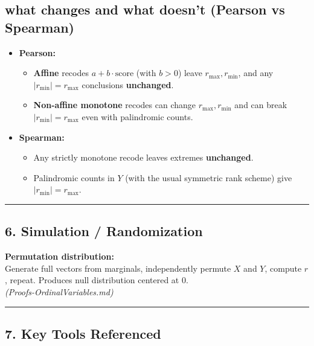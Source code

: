 \documentclass[
  letterpaper,
  DIV=11,
  numbers=noendperiod]{scrartcl}
\theoremstyle{remark}
\begin{document}
\subsection{what changes and what doesn't (Pearson vs
Spearman)}\label{what-changes-and-what-doesnt-pearson-vs-spearman}

\begin{itemize}
\item
  \textbf{Pearson:}

  \begin{itemize}
  \item
    \textbf{Affine} recodes \(a+b\cdot\text{score}\) (with \(b>0\))
    leave \(r_{\max}, r_{\min}\), and any \(|r_{\min}|=r_{\max}\)
    conclusions \textbf{unchanged}.
  \item
    \textbf{Non-affine monotone} recodes can change
    \(r_{\max}, r_{\min}\) and can break \(|r_{\min}|=r_{\max}\) even
    with palindromic counts.
  \end{itemize}
\item
  \textbf{Spearman:}

  \begin{itemize}
  \item
    Any strictly monotone recode leaves extremes \textbf{unchanged}.
  \item
    Palindromic counts in \(Y\) (with the usual symmetric rank scheme)
    give \(|r_{\min}|=r_{\max}\).
  \end{itemize}
\end{itemize}

\begin{center}\rule{0.5\linewidth}{0.5pt}\end{center}

\subsection{6. Simulation /
Randomization}\label{simulation-randomization}

\textbf{Permutation distribution:}\\
Generate full vectors from marginals, independently permute \(X\) and
\(Y\), compute \(r\), repeat. Produces null distribution centered at
0.\\
\emph{(Proofs-OrdinalVariables.md)}

\begin{center}\rule{0.5\linewidth}{0.5pt}\end{center}

\subsection{7. Key Tools Referenced}\label{key-tools-referenced}
\end{document}
